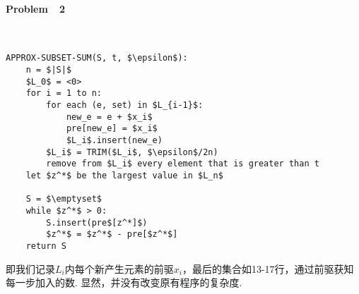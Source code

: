 \documentclass[UTF8]{ctexart}
\begin{document}
\paragraph*{Problem\ \ 2\ \ }\ \par
\begin{lstlisting}[mathescape=true]
APPROX-SUBSET-SUM(S, t, $\epsilon$):
    n = $|S|$
    $L_0$ = <0>
    for i = 1 to n:
        for each (e, set) in $L_{i-1}$:
            new_e = e + $x_i$
            pre[new_e] = $x_i$
            $L_i$.insert(new_e)
        $L_i$ = TRIM($L_i$, $\epsilon$/2n)
        remove from $L_i$ every element that is greater than t
    let $z^*$ be the largest value in $L_n$

    S = $\emptyset$
    while $z^*$ > 0:
        S.insert(pre$[z^*]$)
        $z^*$ = $z^*$ - pre[$z^*$]
    return S        
\end{lstlisting}
即我们记录$L_i$内每个新产生元素的前驱$x_i$，最后的集合如13-17行，通过前驱获知每一步加入的数. 显然，并没有改变原有程序的复杂度.
\end{document}
